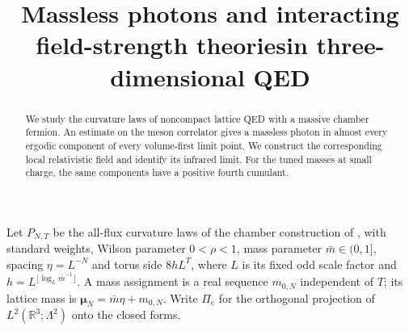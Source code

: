 \documentclass[11pt]{amsart}
\theoremstyle{definition}
\begin{document}
\title{Massless photons and interacting field-strength theories\newline in three-dimensional QED}
\author{}
\date{}
\begin{abstract}
We study the curvature laws of noncompact lattice QED with a massive chamber fermion. An estimate on the meson correlator gives a massless photon in almost every ergodic component of every volume-first limit point. We construct the corresponding local relativistic field and identify its infrared limit. For the tuned masses at small charge, the same components have a positive fourth cumulant.
\end{abstract}
\maketitle

Let $P_{N,T}$ be the all-flux curvature laws of the chamber construction of
\cite{QEDII,QEDIII}, with standard weights, Wilson parameter $0<\rho<1$,
mass parameter $\bar m\in(0,1]$, spacing $\eta=L^{-N}$ and torus side
$8hL^T$, where $L$ is its fixed odd scale factor and
$h=L^{\lfloor\log_L\bar m^{-1}\rfloor}$.
A mass assignment is a real sequence $m_{0,N}$ independent of $T$;
its lattice mass is $\boldsymbol\mu_N=\bar m\eta+m_{0,N}$.
Write $\Pi_{\mathrm c}$ for the orthogonal projection of
$L^2(\mathbb R^3;\Lambda^2)$ onto the closed forms.
\end{document}
